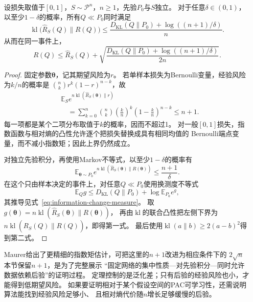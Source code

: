 \begin{theorem}
\label{thm:pac-bayes-bound}
设损失取值于$[0,1]$，$S\sim\mathcal P^n$，$n\geq1$，先验$P_0$与$S$独立。
对于任意$\delta\in(0,1)$，以至少$1-\delta$的概率，所有$Q\ll P_0$同时满足
\begin{equation}
 \operatorname{kl}\bigl(\hat R_S(Q)\|R(Q)\bigr)
 \leq\frac{D_{\mathrm{KL}}(Q\|P_0)+\log((n+1)/\delta)}{n}.
 \label{eq:pac-bayes-kl}
\end{equation}
从而在同一事件上，
\[
 R(Q)\leq\hat R_S(Q)+
 \sqrt{\frac{D_{\mathrm{KL}}(Q\|P_0)+\log((n+1)/\delta)}{2n}}.
\]
\end{theorem}
\begin{proof}
固定参数$\bm\theta$，记其期望风险为$r$。
若单样本损失为Bernoulli变量，经验风险为$k/n$的概率是
$\binom nk r^k(1-r)^{n-k}$，故
\[
 \begin{aligned}
 &\mathbb E_S e^{n\operatorname{kl}(\hat R_S(\bm\theta)\|r)}\\
 &\quad=\sum_{k=0}^n\binom nk
       \left(\frac kn\right)^k\left(1-\frac kn\right)^{n-k}
 \leq n+1.
 \end{aligned}
\]
每一项都是某个二项分布取值于$k$的概率，因而不超过1。
对一般$[0,1]$损失，指数函数与相对熵的凸性允许逐个把损失替换成具有相同均值的
Bernoulli端点变量，而不减小指数矩；因此上界仍然成立。

对独立先验积分，再使用Markov不等式，以至少$1-\delta$的概率有
\[
 \mathbb E_{\bm\theta\sim P_0}
 e^{n\operatorname{kl}(\hat R_S(\bm\theta)\|R(\bm\theta))}
 \leq\frac{n+1}{\delta}.
\]
在这个只由样本决定的事件上，对任意$Q\ll P_0$使用换测度不等式
\begin{equation}
 \mathbb E_Q g\leq D_{\mathrm{KL}}(Q\|P_0)+\log\mathbb E_{P_0}e^g,
 \label{eq:change-of-measure}
\end{equation}
其推导见式~\eqref{eq:information-change-measure}。
取$g(\bm\theta)=n\operatorname{kl}(\hat R_S(\bm\theta)\|R(\bm\theta))$，
再由$\operatorname{kl}$的联合凸性把左侧下界为
$n\operatorname{kl}(\hat R_S(Q)\|R(Q))$，即得第一式。
最后使用$\operatorname{kl}(a\|b)\geq2(a-b)^2$得到第二式。
\end{proof}

Maurer给出了更精细的指数矩估计，可把这里的$n+1$改进为相应条件下的
$2\sqrt n$ 本节保留$n+1$，是为了完整展示
“固定网络的集中性质—对先验积分—同时允许数据依赖后验”的证明过程。
定理控制的是泛化差；只有后验的经验风险也小，才能得到低期望风险。
如果要证明相对于某个假设空间的PAC可学习性，还需说明算法能找到经验风险足够小、
且相对熵代价随$n$增长足够缓慢的后验。

